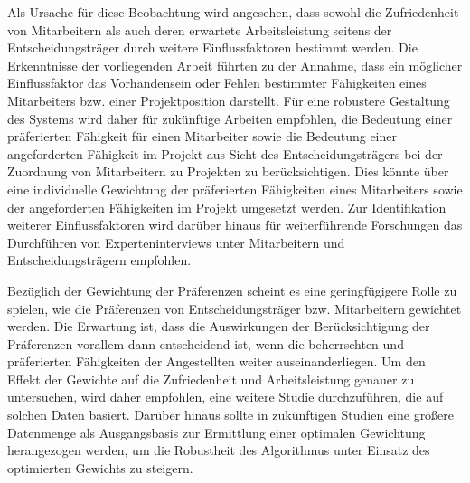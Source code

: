 Als Ursache für diese Beobachtung wird angesehen, dass sowohl die Zufriedenheit von Mitarbeitern als auch deren erwartete Arbeitsleistung seitens der Entscheidungsträger durch weitere Einflussfaktoren bestimmt werden.
Die Erkenntnisse der vorliegenden Arbeit führten zu der Annahme, dass ein möglicher Einflussfaktor das Vorhandensein oder Fehlen bestimmter Fähigkeiten eines Mitarbeiters bzw. einer Projektposition darstellt.
Für eine robustere Gestaltung des Systems wird daher für zukünftige Arbeiten empfohlen, die Bedeutung einer präferierten Fähigkeit für einen Mitarbeiter sowie die Bedeutung einer angeforderten Fähigkeit im Projekt aus Sicht des Entscheidungsträgers bei der Zuordnung von Mitarbeitern zu Projekten zu berücksichtigen.
Dies könnte über eine individuelle Gewichtung der präferierten Fähigkeiten eines Mitarbeiters sowie der angeforderten Fähigkeiten im Projekt umgesetzt werden.
Zur Identifikation weiterer Einflussfaktoren wird darüber hinaus für weiterführende Forschungen das Durchführen von Experteninterviews unter Mitarbeitern und Entscheidungsträgern empfohlen.

Bezüglich der Gewichtung der Präferenzen scheint es eine geringfügigere Rolle zu spielen, wie die Präferenzen von Entscheidungsträger bzw. Mitarbeitern gewichtet werden.
Die Erwartung ist, dass die Auswirkungen der Berücksichtigung der Präferenzen vorallem dann entscheidend ist, wenn die beherrschten und präferierten Fähigkeiten der Angestellten weiter auseinanderliegen.
Um den Effekt der Gewichte auf die Zufriedenheit und Arbeitsleistung genauer zu untersuchen, wird daher empfohlen, eine weitere Studie durchzuführen, die auf solchen Daten basiert.
Darüber hinaus sollte in zukünftigen Studien eine größere Datenmenge als Ausgangsbasis zur Ermittlung einer optimalen Gewichtung herangezogen werden, um die Robustheit des Algorithmus unter Einsatz des optimierten Gewichts zu steigern.

